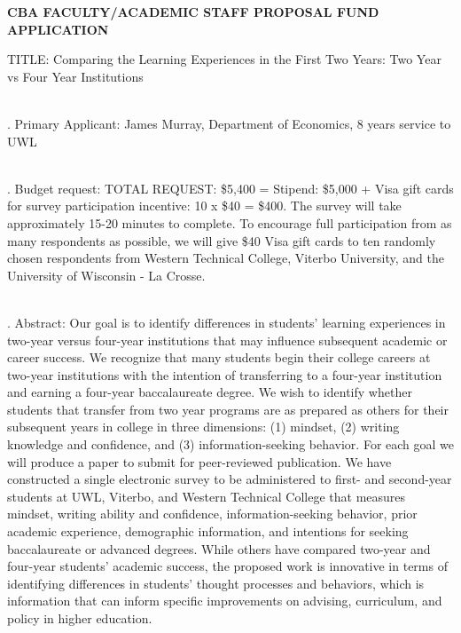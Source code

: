 \documentclass[11pt]{article}
\begin{document}
\thispagestyle{empty}
\setcounter{page}{1}

\begin{center}\textbf{CBA FACULTY/ACADEMIC STAFF PROPOSAL FUND APPLICATION}\end{center} 

\noindent TITLE: Comparing the Learning Experiences in the First Two Years: Two Year vs Four Year Institutions\\

\ \vspace*{-2.5pc}

. Primary Applicant: James Murray, Department of Economics, 8 years service to UWL \\

\ \vspace*{-2.5pc}

. Budget request: TOTAL REQUEST: \$5,400 = Stipend: \$5,000 + Visa gift cards for survey participation incentive: 10 x \$40 = \$400.  The survey will take approximately 15-20 minutes to complete.  To encourage full participation from as many respondents as possible, we will give \$40 Visa gift cards to ten randomly chosen respondents from Western Technical College, Viterbo University, and the University of Wisconsin - La Crosse.\\

\ \vspace*{-2.5pc}

. Abstract: Our goal is to identify differences in students' learning experiences in two-year versus four-year institutions that may influence subsequent academic or career success.  We recognize that many students begin their college careers at two-year institutions with the intention of transferring to a four-year institution and earning a four-year baccalaureate degree.  We wish to identify whether students that transfer from two year programs are as prepared as others for their subsequent years in college in three dimensions: (1) mindset, (2) writing knowledge and confidence, and (3) information-seeking behavior.  For each goal we will produce a paper to submit for peer-reviewed publication. We have constructed a single electronic survey to be administered to first- and second-year students at UWL, Viterbo, and Western Technical College that measures mindset, writing ability and confidence, information-seeking behavior, prior academic experience, demographic information, and intentions for seeking baccalaureate or advanced degrees. While others have compared two-year and four-year students' academic success, the proposed work is innovative in terms of identifying differences in students' thought processes and behaviors, which is information that can inform specific improvements on advising, curriculum, and policy in higher education.\\
\end{document}
